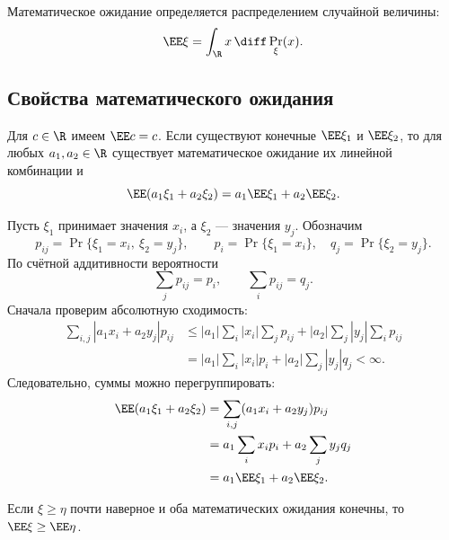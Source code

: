 \begin{consequence}
    Математическое ожидание определяется распределением случайной величины:
    \[
        \EE\xi=\int_\R x\,\diff\Pr_\xi(x).
    \]
\end{consequence}

\newpage
\subsection{Свойства математического ожидания}

\begin{theorem}
    Для $c\in\R$ имеем $\EE c=c$.
    Если существуют конечные $\EE\xi_1$ и $\EE\xi_2$, то для любых
    $a_1,a_2\in\R$ существует математическое ожидание их линейной комбинации и
    \[
        \EE(a_1\xi_1+a_2\xi_2)
        =a_1\EE\xi_1+a_2\EE\xi_2.
    \]
\end{theorem}

\begin{Proof}
    Пусть $\xi_1$ принимает значения $x_i$, а $\xi_2$ --- значения $y_j$.
    Обозначим
    \[
        p_{ij}=\Pr\{\xi_1=x_i,\ \xi_2=y_j\},\qquad
        p_i=\Pr\{\xi_1=x_i\},\quad q_j=\Pr\{\xi_2=y_j\}.
    \]
    По счётной аддитивности вероятности
    \[
        \sum_j p_{ij}=p_i,\qquad \sum_i p_{ij}=q_j.
    \]
    Сначала проверим абсолютную сходимость:
    \[
        \begin{aligned}
            \sum_{i,j}|a_1x_i+a_2y_j|p_{ij}
            &\leq |a_1|\sum_i|x_i|\sum_jp_{ij}
                  +|a_2|\sum_j|y_j|\sum_ip_{ij}\\
            &=|a_1|\sum_i|x_i|p_i+|a_2|\sum_j|y_j|q_j<\infty.
        \end{aligned}
    \]
    Следовательно, суммы можно перегруппировать:
    \[
        \begin{aligned}
            \EE(a_1\xi_1+a_2\xi_2)
            &=\sum_{i,j}(a_1x_i+a_2y_j)p_{ij}\\
            &=a_1\sum_i x_i p_i+a_2\sum_j y_j q_j\\
            &=a_1\EE\xi_1+a_2\EE\xi_2.
        \end{aligned}
    \]
\end{Proof}

\begin{theorem}[Монотонность]
    Если $\xi\geq\eta$ почти наверное и оба математических ожидания конечны,
    то $\EE\xi\geq\EE\eta$.
\end{theorem}

